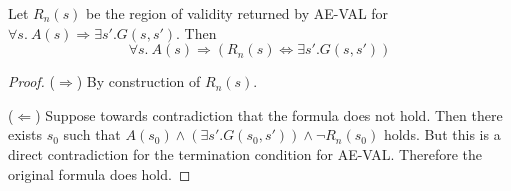 

\begin{lemma}\label{lem:aeval}
  Let $R_n(s)$ be the region of validity returned by AE-VAL for $\forall
  s.~ A(s) \Rightarrow \exists s'. G(s, s')$. Then
  \begin{equation*}
  \forall s.~ A(s) \Rightarrow (R_n(s) \Leftrightarrow \exists s'. G(s, s'))
  \end{equation*}
\end{lemma}
\begin{proof}
  ($\Rightarrow$) By construction of $R_n(s)$.

  ($\Leftarrow$) Suppose towards contradiction that the formula does
  not hold. Then there exists $s_0$ such that $A(s_0) \land (\exists
  s'. G(s_0, s')) \land \neg R_n(s_0)$ holds. But this is a direct
  contradiction for the termination condition for AE-VAL. Therefore
  the original formula does hold.
\end{proof}



